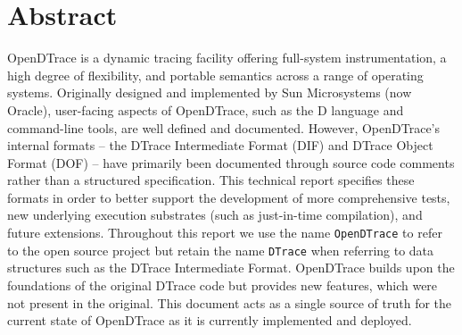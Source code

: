 \section*{Abstract}

OpenDTrace is a dynamic tracing facility offering full-system instrumentation,
a high degree of flexibility, and portable semantics across a range of
operating systems.
Originally designed and implemented by Sun Microsystems (now Oracle),
user-facing aspects of OpenDTrace, such as the D language and
command-line tools,
are well defined and documented.
However, OpenDTrace's internal formats --
the DTrace Intermediate Format (DIF) and
DTrace Object Format (DOF) -- have primarily been documented through source
code comments rather than a structured specification.
This technical report specifies these formats in order to better support the
development of more comprehensive tests, new underlying execution substrates
(such as just-in-time compilation), and future extensions.
Throughout this report we use the name \texttt{OpenDTrace} to refer
to the open source project but retain the name \texttt{DTrace} when
referring to data structures such as the DTrace Intermediate Format.
OpenDTrace builds upon the foundations of the original DTrace code but
provides new features, which were not present in the original.
This document acts as a single source of truth for the current state
of OpenDTrace as it is currently implemented and deployed.
